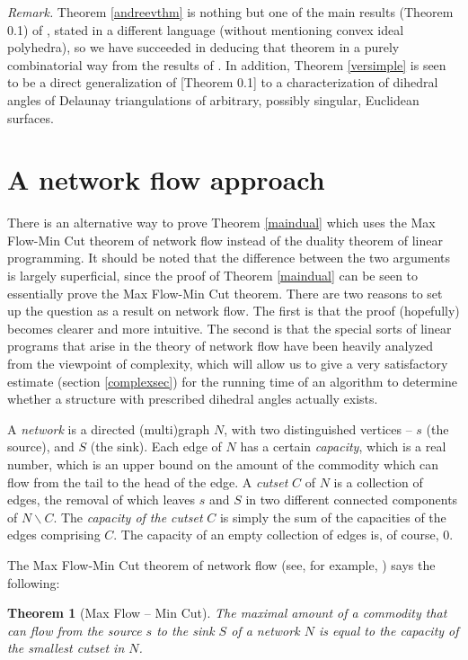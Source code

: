 \documentclass{acmart}
\newtheorem{theorem}{Theorem}[section]
\begin{document}
\medskip\noindent
\textit{Remark.} Theorem \ref{andreevthm} is nothing but one of the
main results (Theorem 0.1) of \cite{steiner}, stated in a different
language (without mentioning convex ideal polyhedra), so we have
succeeded in deducing that theorem in a purely combinatorial way from
the results of \cite{rvol}. In addition, Theorem \ref{versimple} is
seen to be a direct generalization of \cite{steiner}[Theorem 0.1] to
a characterization of dihedral angles of Delaunay triangulations of
arbitrary, possibly singular, Euclidean surfaces.

\section{A network flow approach}
\label{nflow}

There is an alternative way to prove Theorem \ref{maindual} which uses the
Max Flow-Min Cut theorem of network flow instead of the duality 
theorem of linear programming. It should be noted that the difference 
between the two arguments is largely superficial, since the proof of 
Theorem \ref{maindual} can be seen to essentially prove the Max Flow-Min 
Cut theorem. There are two reasons to set up the question as a result 
on network flow. The first is that the proof (hopefully) becomes 
clearer and more intuitive. The second is that the special sorts of 
linear programs that arise in the theory of network flow have been 
heavily analyzed from the viewpoint of complexity, which will allow 
us to give a very satisfactory estimate (section \ref{complexsec}) 
for the running time of an algorithm to determine whether a structure 
with prescribed dihedral angles actually exists.

A \emph{network} is a directed (multi)graph $N$, with two distinguished 
vertices -- $s$ (the source), and $S$ (the sink). Each edge of $N$ 
has a certain \emph{capacity}, which is a real number, which is an 
upper bound on the amount of the commodity which can flow from the 
tail to the head of the edge. A \emph{cutset} $C$ of $N$ is a collection of 
edges, the removal of which leaves $s$ and $S$ in two different 
connected components of $N \backslash C$. The \emph{capacity of the
  cutset} 
$C$ is simply the sum of the capacities of the edges comprising $C$. 
The capacity of an empty collection of edges is, of course, $0$.

The Max Flow-Min Cut theorem of network flow (see, for example,
\cite[Chapter 7]{vlw}) says the following:

\begin{theorem}[Max Flow -- Min Cut]
\label{mfmc}
The maximal amount of a commodity that can flow from the source $s$ to 
the sink $S$ of a network $N$ is equal to the capacity of the smallest 
cutset in $N$.
\end{theorem}
\end{document}
